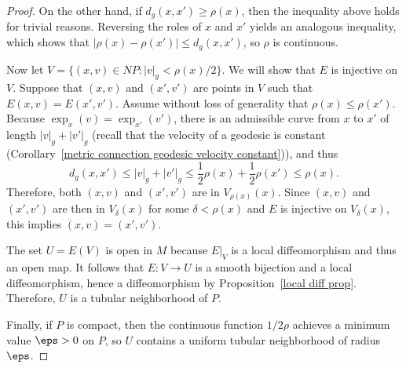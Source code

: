 \begin{proof}
On the other hand, if $d_g(x,x')\geq\rho(x)$, then the inequality above holds for trivial reasons. Reversing the roles of $x$ and $x'$ yields an analogous inequality, 
which shows that $|\rho(x)-\rho(x')|\leq d_g(x,x')$, so $\rho$ is continuous.\par
Now let $V=\{(x,v)\in NP:|v|_g<\rho(x)/2\}$. We will show that $E$ is injective on $V$. Suppose that $(x,v)$ and $(x',v')$ are points in $V$ such that $E(x,v)=E(x',v')$. 
Assume without loss of generality that $\rho(x)\leq\rho(x')$. Because $\exp_x(v)=\exp_{x'}(v')$, there is an admissible curve from $x$ to $x'$ of length $|v|_g+|v'|_g$ 
(recall that the velocity of a geodesic is constant (Corollary~\ref{metric connection geodesic velocity constant})), and thus
\[d_g(x,x')\leq|v|_g+|v'|_g\leq\frac{1}{2}\rho(x)+\frac{1}{2}\rho(x')\leq\rho(x).\]
Therefore, both $(x,v)$ and $(x',v')$ are in $V_{\rho(x)}(x)$. Since $(x,v)$ and $(x',v')$ are then in $V_\delta(x)$ for some $\delta<\rho(x)$ and $E$ is injective on 
$V_\delta(x)$, this implies $(x,v)=(x',v')$.\par
The set $U=E(V)$ is open in $M$ because $E|_V$ is a local diffeomorphism and thus an open map. It follows that $E:V\to U$ is a smooth bijection and a local diffeomorphism, 
hence a diffeomorphism by Proposition~\ref{local diff prop}. Therefore, $U$ is a tubular neighborhood of $P$.\par
Finally, if $P$ is compact, then the continuous function $1/2\rho$ achieves a minimum value $\eps>0$ on $P$, so $U$ contains a uniform tubular neighborhood of radius $\eps$.
\end{proof}
